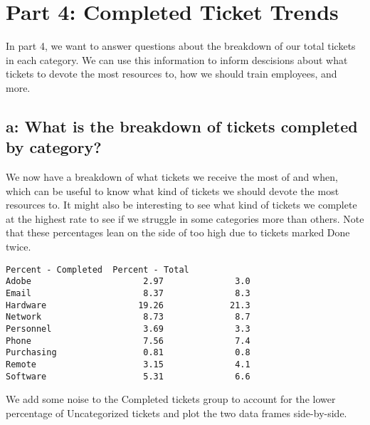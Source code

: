 \documentclass[11pt]{article}
\begin{document}
    \hypertarget{part-4-completed-ticket-trends}{%
\section{Part 4: Completed Ticket
Trends}\label{part-4-completed-ticket-trends}}

In part 4, we want to answer questions about the breakdown of our total
tickets in each category. We can use this information to inform
descisions about what tickets to devote the most resources to, how we
should train employees, and more.

\hypertarget{a-what-is-the-breakdown-of-tickets-completed-by-category}{%
\subsection{a: What is the breakdown of tickets completed by
category?}\label{a-what-is-the-breakdown-of-tickets-completed-by-category}}

    We now have a breakdown of what tickets we receive the most of and when,
which can be useful to know what kind of tickets we should devote the
most resources to. It might also be interesting to see what kind of
tickets we complete at the highest rate to see if we struggle in some
categories more than others. Note that these percentages lean on the
side of too high due to tickets marked Done twice.


    \begin{Verbatim}[commandchars=\\\{\}]
            Percent - Completed  Percent - Total
Adobe                      2.97              3.0
Email                      8.37              8.3
Hardware                  19.26             21.3
Network                    8.73              8.7
Personnel                  3.69              3.3
Phone                      7.56              7.4
Purchasing                 0.81              0.8
Remote                     3.15              4.1
Software                   5.31              6.6

    \end{Verbatim}

    We add some noise to the Completed tickets group to account for the
lower percentage of Uncategorized tickets and plot the two data frames
side-by-side.

    \begin{center}
    \end{center}
    { \hspace*{\fill} \\}
    
\end{document}
